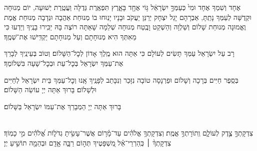\documentclass[twoside, openany, parskip=half, 11pt]{book}
\begin{document}

אֶחָד וְשִׁמְךָ אֶחָד וּמִי֙ כְּעַמְּךָ֣ יִשְׂרָאֵ֔ל גּ֥וֹי אֶחָ֖ד בָּאָ֑רֶץ תִּפְאֶֽרֶת גְּדֻלָּה וַעֲטֶֽרֶת יְשׁוּעָה, יוֹם מְנוּחָה וּקְדֻשָּׁה לְעַמְּךָ נָתַֽתָּ, אַבְרָהָם יָגֵל יִצְחָק יְרַנֵּן יַעֲקֹב וּבָנָיו יָנֽוּחוּ בוֹ מְנוּחַת אַהֲבָה וּנְדָבָה מְנוּחַת אֱמֶת וֶאֱמוּנָה מְנוּחַת שָׁלוֹם וְשַׁלְוָה וְהַשְׁקֵט וָבֶֽטַח מְנוּחָה שְׁלֵמָה שָׁאַתָּה רוֹצֶה בָּהּ יַכִּֽירוּ בָנֶֽיךָ וְיֵדְעוּ כִּי מֵאִתְּךָ הִיא מְנוּחָתָם וְעַל מְנוּחָתָם יַקְדִּֽישׁוּ אֶת־שְׁמֶֽךָ׃

 

\sepline

\label{ytmincha}
\ytkiddushhayom{}

\sepline

\retzeh

\yaalehveyavo

\zion

\modim

\shabboschanukah

\shabboshodos

רָב עַל יִשְׂרָאֵל עַמְּךָ תָּשִׂים לְעוֹלָם כִּי אַתָּה הוּא מֶֽלֶךְ אָדוֹן לְכׇל־הַשָּׁלוֹם׃ וְטוֹב בְּעֵינֶֽיךָ לְבָרֵךְ אֶת־עַמְּךָ יִשְׂרָאֵל בְּכׇל־עֵת וּבְכׇל־שָׁעָה בִּשְׁלוֹמֶךָ׃
\vspace{-0.4\baselineskip}
\begin{paracol}{2}

\begin{small}
בְּסֵֽפֶר חַיִּים בְּרָכָה וְשָׁלוֹם וּפַרְנָסָה טוֹבָה נִזָּכֵר וְנִכָּתֵב לְפָנֶֽיךָ אָֽנוּ וְכׇל־עַמְּךָ בֵּית יִשְׂרָאֵל לְחַיִּים וּלְשָׁלוֹם׃ בָּרוּךְ אַתָּה יְיָ עוֹשֵׂה הַשָּׁלוֹם׃

\end{small}
\switchcolumn
בָּרוּךְ אַתָּה יְיָ הַמְבָרֵךְ אֶת־עַמּוֹ יִשְׂרָאֵל בַּשָּׁלוֹם׃

\end{paracol}

\tachanunim

\\
צִדְקָתְךָ֣ צֶ֣דֶק לְעוֹלָ֑ם וְֽתוֹרָתְךָ֥ אֱמֶֽת׃ וְצִדְקָתְךָ֥ אֱלֹהִ֗ים עַד־מָ֫ר֥וֹם אֲשֶׁר־עָשִׂ֥יתָ גְדֹל֑וֹת אֱ֝לֹהִ֗ים מִ֣י כָמֽוֹךָ׃ צִדְקָתְךָ֨ ׀ כְּֽהַרְרֵי־אֵ֗ל מִ֭שְׁפָּטֶיךָ תְּה֣וֹם רַבָּ֑ה אָ֤דָֽם וּבְהֵמָ֖ה תוֹשִׁ֣יעַ יְיָ׃
\end{document}
